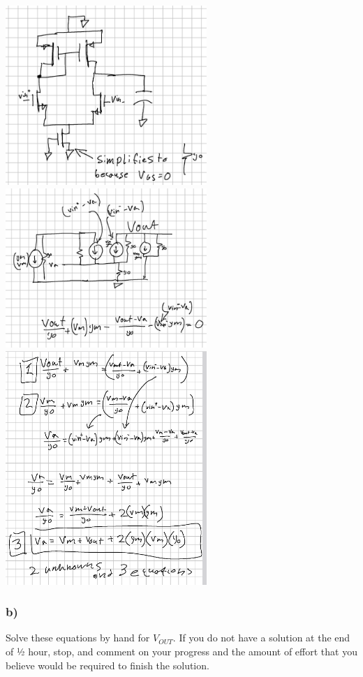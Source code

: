 \documentclass[10pt,a4paper]{article}
\begin{document}
\includegraphics[width=3in]{images/p1p1.png} \\
\includegraphics[width=3in]{images/p1p2.png} \\
\includegraphics[width=3in]{images/p1p3.png} \\




\subsubsection*{b)}
Solve these equations by hand for \(V_{OUT}\). If you do not have a solution at
the end of ½ hour, stop, and comment on your progress and the amount of
effort that you believe would be required to finish the solution.
\end{document}
